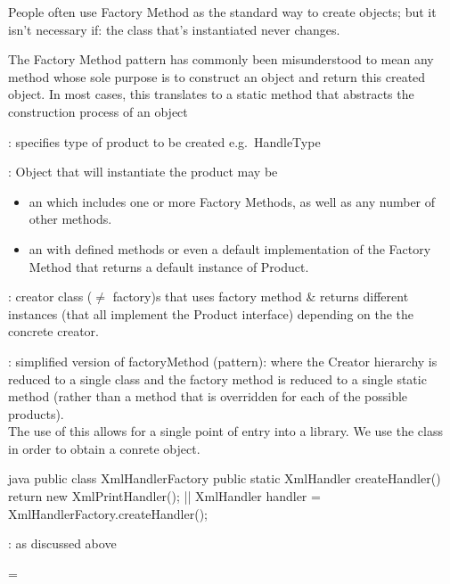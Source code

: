 \begin{notebox}[Note]\nospacing
  People often use Factory Method as the standard way to create objects; but it isn't necessary if: the class that's instantiated never changes.
\end{notebox}
\begin{notebox}[Note]\nospacing
  The Factory Method pattern has commonly been misunderstood to mean any method whose sole purpose is to construct an object and return this created object. In most cases, this translates to a static method that abstracts the construction process of an object
\end{notebox}
\begin{partbox}[Participants]
  \begin{itemizenosep}
    \item {}: specifies type of product to be
  created e.g.\ HandleType
    \item {}: Object that will instantiate the
  product may be
  \begin{itemize}
      \item an  which includes one or more Factory
    Methods, as well as any number of other methods.
      \item an 
    with defined methods or even a default implementation of the Factory Method that returns a default instance of Product. 
  \end{itemize}
    \item {}: creator class ($\neq$ factory)s that uses
    factory method \& returns different  instances
    (that all implement the Product interface) depending on the the concrete
    creator. 
  \end{itemizenosep}
\end{partbox}
\begin{sectionbox}[Implementation]\nospacing
  \begin{itemizenosep}
      \item {}: simplified version of factoryMethod
    (pattern):
    where the Creator hierarchy is reduced to a single class and the factory
    method is reduced to a single static method (rather than a method that is
    overridden for each of the possible products).\\
    The use of this  allows for a single point of
    entry into a library. We use the class in order to obtain a conrete object.
    \begin{mintlinebox}{java}
      public class XmlHandlerFactory {
        public static XmlHandler createHandler() {
          return new XmlPrintHandler();
        }
      }
      |\optldots|
      XmlHandler handler = XmlHandlerFactory.createHandler();
    \end{mintlinebox}
      \item {}: as discussed above
      \item {} = 
  \end{itemizenosep}
\end{sectionbox}
